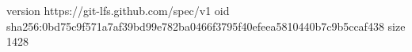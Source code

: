 version https://git-lfs.github.com/spec/v1
oid sha256:0bd75c9f571a7af39bd99e782ba0466f3795f40efeea5810440b7c9b5ccaf438
size 1428
